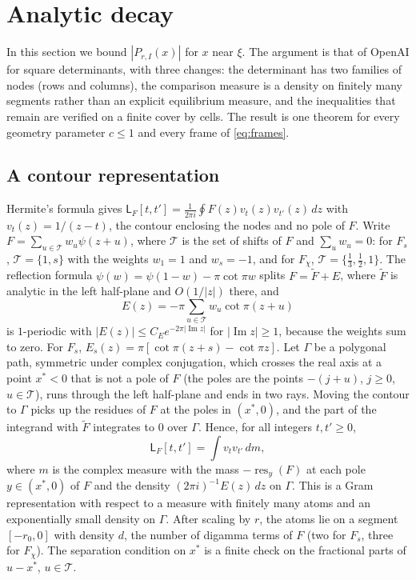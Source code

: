 \documentclass[11pt]{amsart}
\theoremstyle{definition}
\theoremstyle{remark}
\numberwithin{equation}{section}
\renewcommand{\Im}{\operatorname{Im}}
\newcommand{\Lw}{\mathsf L}          %
\begin{document}
\section{Analytic decay}\label{sec:decay}

In this section we bound $|P_{r,I}(x)|$ for $x$ near $\xi$. The argument is that of OpenAI \cite{OpenAI2026} for
square determinants, with three changes: the determinant has two families of nodes (rows and columns), the
comparison measure is a density on finitely many segments rather than an explicit equilibrium measure, and the
inequalities that remain are verified on a finite cover by cells. The result is one theorem for every geometry
parameter $c\le1$ and every frame of \eqref{eq:frames}.

\subsection{A contour representation}
Hermite's formula gives $\Lw_F[t,t']=\frac1{2\pi i}\oint F(z)v_t(z)v_{t'}(z)\,dz$ with $v_t(z)=1/(z-t)$, the contour enclosing
the nodes and no pole of $F$. Write $F=\sum_{u\in\mathcal T}w_u\psi(z+u)$, where $\mathcal T$ is the set of shifts of $F$ and
$\sum_uw_u=0$: for $F_s$, $\mathcal T=\{1,s\}$ with the weights $w_1=1$ and $w_s=-1$, and for $F_\chi$,
$\mathcal T=\{\frac13,\frac12,1\}$. The reflection formula $\psi(w)=\psi(1-w)-\pi\cot\pi w$ splits $F=\tilde F+E$, where
$\tilde F$ is analytic in the left half-plane and $O(1/|z|)$ there, and
\[
 E(z)=-\pi\sum_{u\in\mathcal T}w_u\cot\pi(z+u)
\]
is $1$-periodic with $|E(z)|\le C_Ee^{-2\pi|\Im z|}$ for $|\Im z|\ge1$, because the weights sum to zero. For $F_s$,
$E_s(z)=\pi[\cot\pi(z+s)-\cot\pi z]$. Let $\Gamma$ be a polygonal path, symmetric under complex conjugation, which crosses
the real axis at a point $x^*<0$ that is not a pole of $F$ (the poles are the points $-(j+u)$, $j\ge0$, $u\in\mathcal T$),
runs through the left half-plane and ends in two rays. Moving the contour to $\Gamma$ picks up the residues of $F$ at the
poles in $(x^*,0)$, and the part of the integrand with $\tilde F$ integrates to $0$ over $\Gamma$. Hence, for all integers
$t,t'\ge0$,
\begin{equation}\label{eq:gram}
 \Lw_F[t,t']=\int v_tv_{t'}\,dm,
\end{equation}
where $m$ is the complex measure with the mass $-\operatorname{res}_y(F)$ at each pole $y\in(x^*,0)$ of $F$ and the density
$(2\pi i)^{-1}E(z)\,dz$ on $\Gamma$. This is a Gram representation with respect to a measure with finitely many atoms and
an exponentially small density on $\Gamma$. After scaling by $r$, the atoms lie on a segment $[-r_0,0]$ with density $d$, the number of digamma
terms of $F$ (two for $F_s$, three for $F_\chi$). The separation condition on $x^*$ is a finite check on the
fractional parts of $u-x^*$, $u\in\mathcal T$.
\end{document}

